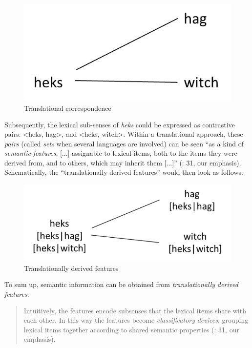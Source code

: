 \begin{figure}
\includegraphics[height=.3\textheight]{figures/Vandevoorde2-img2.png}
\caption{\label{fig:key:3}  Translational correspondence}
\end{figure}


Subsequently, the lexical sub-senses of \textit{heks} could be expressed as contrastive pairs: <heks, hag>, and <heks, witch>. Within a translational approach, these \textit{pairs} (called \textit{sets} when several languages are involved) can be seen “as a kind of \textit{semantic} \textit{features}, [...] assignable to lexical items, both to the items they were derived from, and to others, which may inherit them [...]” (\citealt{langemets_translations_2005}: 31, our emphasis). Schematically, the “translationally derived features” would then look as follows:


\begin{figure}
\includegraphics[height=.3\textheight]{figures/Vandevoorde2-img3.png}
\caption{\label{fig:key:4}  Translationally derived features}
\end{figure}


To sum up, semantic information can be obtained from \textit{translationally} \textit{derived} \textit{features}:


\begin{quote}
Intuitively, the features encode subsenses that the lexical items share with each other. In this way the features become \textit{classificatory} \textit{devices}, grouping lexical items together according to shared semantic properties (\citealt{langemets_translations_2005}: 31, our emphasis).
\end{quote}


